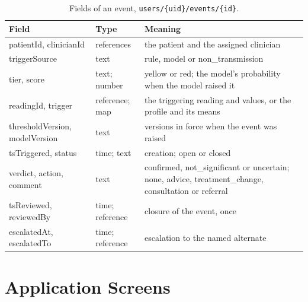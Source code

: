 \begin{table}[htbp]
\centering\footnotesize
\caption{Fields of an event, \texttt{users/\{uid\}/events/\{id\}}.}\label{tab:schema-event}
\begin{tabularx}{\textwidth}{@{}>{\ttfamily\raggedright\arraybackslash}p{3.4cm} >{\raggedright\arraybackslash}p{2.1cm} X@{}}
\toprule
\normalfont\textbf{Field} & \textbf{Type} & \textbf{Meaning} \\
\midrule
patientId, clinicianId & references & the patient and the assigned clinician \\
triggerSource & text & rule, model or non\_transmission \\
tier, score & text; number & yellow or red; the model's probability when the model raised it \\
readingId, trigger & reference; map & the triggering reading and values, or the profile and its means \\
thresholdVersion, modelVersion & text & versions in force when the event was raised \\
tsTriggered, status & time; text & creation; open or closed \\
verdict, action, comment & text & confirmed, not\_significant or uncertain; none, advice, treatment\_change, consultation or referral \\
tsReviewed, reviewedBy & time; reference & closure of the event, once \\
escalatedAt, escalatedTo & time; reference & escalation to the named alternate \\
\bottomrule
\end{tabularx}
\end{table}

\chapter{Application Screens}\label{app:screens}

